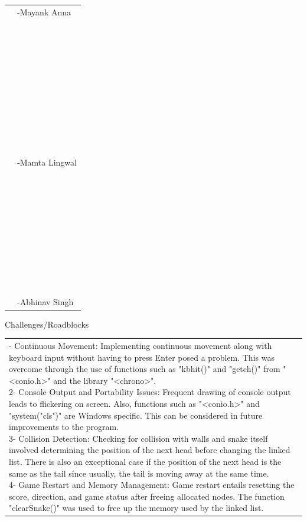 \documentclass[12pt,a4paper]{article}
\newcommand{\sectiontitle}[1]{%
    {\color{GEUBlue}
    \fontsize{18}{22}\selectfont #1}
}
\newcommand{\answerbox}[2]{%
    \begin{tabularx}{\textwidth}{
        |>{\raggedright\arraybackslash}X|}
        \hline
        \parbox[t][#1][t]{\dimexpr\linewidth-12pt\relax}{
            \vspace{5pt}
            \fontsize{11}{13}\selectfont #2
        }\\
        \hline
    \end{tabularx}
}
\begin{document}
\begin{tabularx}{\textwidth}{
|>{\raggedright\arraybackslash}X
|>{\raggedright\arraybackslash}X|
}
{8. Debugging: Identified and resolved errors encountered during implementation, improving the correctness of linked-list operations, game logic, and overall program execution.
}
&
\parbox[t][10.25cm][t]{\linewidth}{-Mayank Anna\\
\\
\\
\\
\\
\\
\\
\\
\\
\\
\\
\\
\\

-Mamta Lingwal\\
\\
\\
\\
\\
\\
\\
\\
\\
\\
\\
\\

-Abhinav Singh}
\\
\hline
\end{tabularx}

\vspace{10cm}

\sectiontitle{Challenges/Roadblocks}

\vspace{0.05cm}

\vspace{0.18cm}

\answerbox{8.05cm}{1- Continuous Movement: Implementing continuous movement along with keyboard input without having to press Enter posed a problem. This was overcome through the use of functions such as "kbhit()" and "getch()" from "<conio.h>" and the library "<chrono>". \\

2- Console Output and Portability Issues: Frequent drawing of console output leads to flickering on screen. Also, functions such as "<conio.h>" and "system("cls")" are Windows specific. This can be considered in future improvements to the program.\\

3- Collision Detection: Checking for collision with walls and snake itself involved determining the position of the next head before changing the linked list. There is also an exceptional case if the position of the next head is the same as the tail since usually, the tail is moving away at the same time.\\

4- Game Restart and Memory Management: Game restart entails resetting the score, direction, and game status after freeing allocated nodes. The function "clearSnake()" was used to free up the memory used by the linked list.
}
\end{document}
